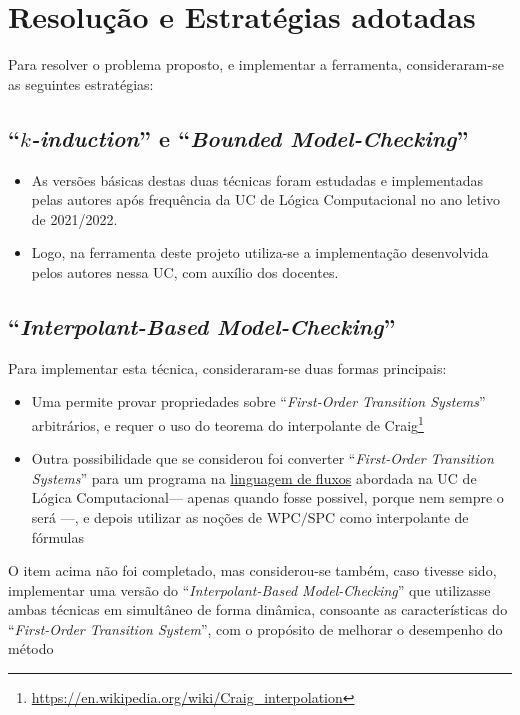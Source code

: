 \documentclass[11pt,a4paper]{report}%
\def\bmc{``\textit{Bounded Model-Checking}''\xspace}
\def\imc{``\textit{Interpolant-Based Model-Checking}''\xspace}
\def\fotss{``\textit{First-Order Transition Systems}''\xspace}
\def\fots{``\textit{First-Order Transition System}''\xspace}
\def\lc{Lógica Computacional\xspace}
\def\kind{``\textit{$k$-induction}''\xspace}
\begin{document}
\section{Resolução e Estratégias adotadas}

Para resolver o problema proposto, e implementar a ferramenta, consideraram-se as seguintes estratégias:

\subsection{\kind e \bmc}
\begin{itemize}
    \item As versões básicas destas duas técnicas foram estudadas e implementadas pelas autores
    após frequência da UC de \lc no ano letivo de 2021/2022.
    \item Logo, na ferramenta deste projeto utiliza-se a implementação desenvolvida pelos autores
    nessa UC, com auxílio dos docentes.
\end{itemize}

\subsection{\imc}

Para implementar esta técnica, consideraram-se duas formas principais:

\begin{itemize}
    \item Uma permite provar propriedades sobre \fotss arbitrários, e requer o uso do teorema do
    interpolante de Craig\footnote{\url{https://en.wikipedia.org/wiki/Craig_interpolation}}
    \item Outra possibilidade que se considerou foi converter \fotss para um programa na \href{https://paper.dropbox.com/doc/Capitulo-5-Verificacao-Formal-de-Software-e95D7fVpc0dArh4pnVl1l#:uid=965576973936347812020135&h2=Fluxos}{linguagem de fluxos} abordada na UC de \lc --- apenas quando fosse possivel, porque nem sempre o será ---, e depois
    utilizar as noções de \href{https://paper.dropbox.com/doc/Capitulo-5-Verificacao-Formal-de-Software-e95D7fVpc0dArh4pnVl1l#:uid=847823822173927851567448&h2=Denota%C3%A7%C3%A3o-WPC-e-sua-linguagem-}{$\text{WPC/SPC}$} como interpolante de fórmulas
\end{itemize}

O item acima não foi completado, mas considerou-se também, caso tivesse sido, implementar uma
    versão do \imc que utilizasse ambas técnicas em simultâneo de forma dinâmica, consoante as características
    do \fots, com o propósito de melhorar o desempenho do método
\end{document}
